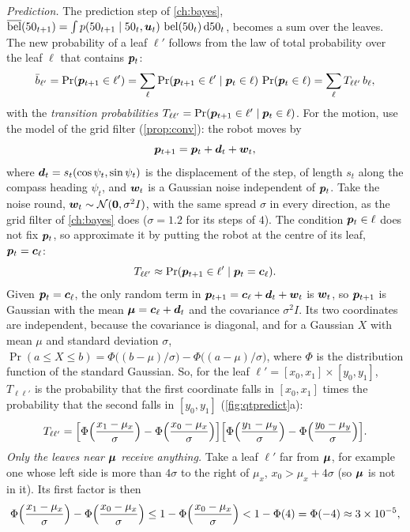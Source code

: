 \emph{Prediction.} The prediction step of \cref{ch:bayes},
$\overline{\operatorname{bel}}(50_{t+1})=\int p(50_{t+1}\mid50_t,\bm{u}_t)\,\operatorname{bel}(50_t)\,\mathrm d50_t$,
becomes a sum over the leaves. The new probability of a leaf $\ell'$
follows from the law of total probability over the leaf $\ell$ that
contains $\bm{p}_t$:
\[
  \bar b_{\ell'}=\Pr(\bm{p}_{t+1}\in\ell')
  =\sum_\ell\Pr(\bm{p}_{t+1}\in\ell'\mid\bm{p}_t\in\ell)\,\Pr(\bm{p}_t\in\ell)
  =\sum_\ell T_{\ell\ell'}\,b_\ell ,
\]
with the \emph{transition probabilities}
$T_{\ell\ell'}=\Pr(\bm{p}_{t+1}\in\ell'\mid\bm{p}_t\in\ell)$. For the motion, use the model of the grid filter (\cref{prop:conv}): the
robot moves by
\[
  \bm{p}_{t+1}=\bm{p}_t+\bm{d}_t+\bm{w}_t ,
\]
where $\bm{d}_t=s_t(\cos\psi_t,\sin\psi_t)$ is the displacement of the
step, of length $s_t$ along the compass heading $\psi_t$, and $\bm{w}_t$ is a
Gaussian noise independent of $\bm{p}_t$. Take the noise round,
$\bm{w}_t\sim\mathcal{N}(\bm{0},\sigma^2I)$, with the same spread $\sigma$ in
every direction, as the grid filter of \cref{ch:bayes} does ($\sigma=1.2$
for its steps of $4$). The condition $\bm{p}_t\in\ell$ does not fix $\bm{p}_t$, so approximate it by
putting the robot at the centre of its leaf, $\bm{p}_t=\bm{c}_\ell$:
\[
  T_{\ell\ell'}\approx\Pr(\bm{p}_{t+1}\in\ell'\mid\bm{p}_t=\bm{c}_\ell).
\]
Given $\bm{p}_t=\bm{c}_\ell$, the only random term in
$\bm{p}_{t+1}=\bm{c}_\ell+\bm{d}_t+\bm{w}_t$ is $\bm{w}_t$, so $\bm{p}_{t+1}$ is
Gaussian with the mean $\bm{\mu}=\bm{c}_\ell+\bm{d}_t$ and the
covariance $\sigma^2I$. Its two coordinates are independent, because the
covariance is diagonal, and for a Gaussian $X$ with mean $\mu$ and
standard deviation $\sigma$,
$\Pr(a\le X\le b)=\Phi\bigl((b-\mu)/\sigma\bigr)-\Phi\bigl((a-\mu)/\sigma\bigr)$,
where $\Phi$ is the distribution function of the standard Gaussian. So, for the leaf $\ell'=[x_0,x_1]\times[y_0,y_1]$, $T_{\ell\ell'}$ is
the probability that the first coordinate falls in $[x_0,x_1]$ times the
probability that the second falls in $[y_0,y_1]$
(\cref{fig:qtpredict}a):
\[
  T_{\ell\ell'}=
  \Bigl[\Phi\Bigl(\frac{x_1-\mu_x}{\sigma}\Bigr)
       -\Phi\Bigl(\frac{x_0-\mu_x}{\sigma}\Bigr)\Bigr]
  \Bigl[\Phi\Bigl(\frac{y_1-\mu_y}{\sigma}\Bigr)
       -\Phi\Bigl(\frac{y_0-\mu_y}{\sigma}\Bigr)\Bigr].
\]
\emph{Only the leaves near $\bm{\mu}$ receive anything.} Take a leaf
$\ell'$ far from $\bm{\mu}$, for example one whose left side is more than
$4\sigma$ to the right of $\mu_x$, $x_0>\mu_x+4\sigma$ (so $\bm{\mu}$ is
not in it). Its first factor is then
\[
  \Phi\Bigl(\frac{x_1-\mu_x}{\sigma}\Bigr)
  -\Phi\Bigl(\frac{x_0-\mu_x}{\sigma}\Bigr)
  \le1-\Phi\Bigl(\frac{x_0-\mu_x}{\sigma}\Bigr)
  <1-\Phi(4)=\Phi(-4)\approx3\times10^{-5},
\]
